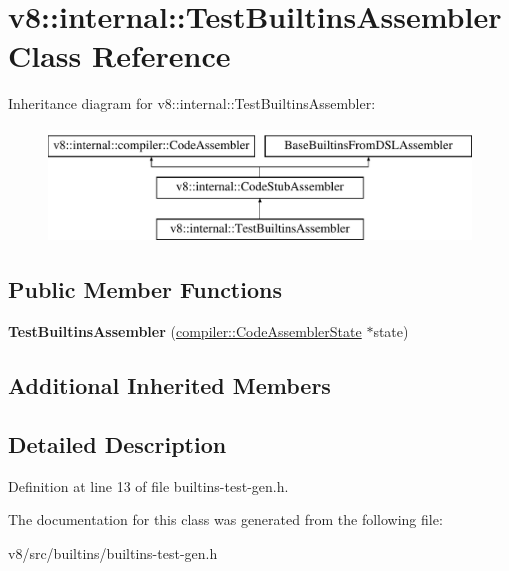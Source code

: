 \hypertarget{classv8_1_1internal_1_1TestBuiltinsAssembler}{}\section{v8\+:\+:internal\+:\+:Test\+Builtins\+Assembler Class Reference}
\label{classv8_1_1internal_1_1TestBuiltinsAssembler}
Inheritance diagram for v8\+:\+:internal\+:\+:Test\+Builtins\+Assembler\+:\begin{figure}[H]
\begin{center}
\leavevmode
\includegraphics[height=3.000000cm]{classv8_1_1internal_1_1TestBuiltinsAssembler}
\end{center}
\end{figure}
\subsection*{Public Member Functions}
\begin{DoxyCompactItemize}
\item 
\mbox{\label{classv8_1_1internal_1_1TestBuiltinsAssembler_aa1567b31456c6d2f2b2a65e98084f072}} 
{\bfseries Test\+Builtins\+Assembler} (\mbox{\hyperlink{classv8_1_1internal_1_1compiler_1_1CodeAssemblerState}{compiler\+::\+Code\+Assembler\+State}} $\ast$state)
\end{DoxyCompactItemize}
\subsection*{Additional Inherited Members}


\subsection{Detailed Description}


Definition at line 13 of file builtins-\/test-\/gen.\+h.



The documentation for this class was generated from the following file\+:\begin{DoxyCompactItemize}
\item 
v8/src/builtins/builtins-\/test-\/gen.\+h\end{DoxyCompactItemize}
